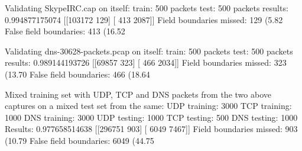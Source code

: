 \documentclass[]{article}
\begin{document}
Validating SkypeIRC.cap on itself:
train: 500 packets
test: 500 packets
results:
0.994877175074
[[103172    129]
 [   413   2087]]
 Field boundaries missed: 129 (5.82%
 False field boundaries: 413 (16.52%

Validating dns-30628-packets.pcap on itself:
train: 500 packets
test: 500 packets
results:
0.989144193726
[[69857   323]
 [  466  2034]]
 Field boundaries missed: 323 (13.70%
 False field boundaries: 466 (18.64%

Mixed training set with UDP, TCP and DNS packets from the two above captures
on a mixed test set from the same:
UDP training: 3000
TCP training: 1000
DNS training: 3000
UDP testing: 1000
TCP testing: 500
DNS testing: 1000
Results:
0.977658514638
[[296751    903]
 [  6049   7467]]
 Field boundaries missed: 903 (10.79%
 False field boundaries: 6049 (44.75%
\end{document}
